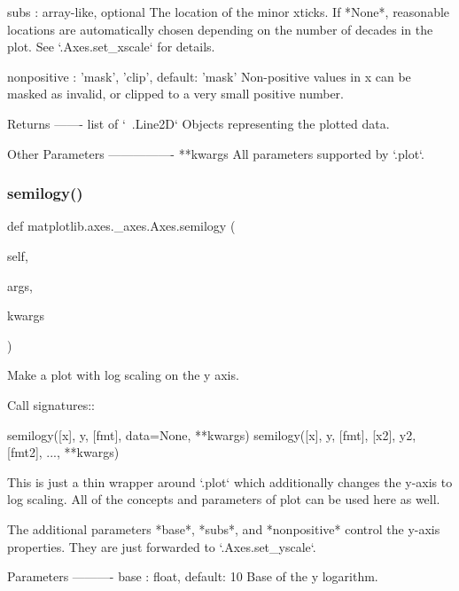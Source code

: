 \begin{DoxyVerb}
\begin{DoxyVerb}
subs : array-like, optional
    The location of the minor xticks. If *None*, reasonable locations
    are automatically chosen depending on the number of decades in the
    plot. See `.Axes.set_xscale` for details.

nonpositive : {'mask', 'clip'}, default: 'mask'
    Non-positive values in x can be masked as invalid, or clipped to a
    very small positive number.

Returns
-------
list of `~.Line2D`
    Objects representing the plotted data.

Other Parameters
----------------
**kwargs
    All parameters supported by `.plot`.
\end{DoxyVerb}
 \mbox{\label{classmatplotlib_1_1axes_1_1__axes_1_1Axes_a0f528c3e2a4da34394c9a3c062656ab4}} 
\subsubsection{\texorpdfstring{semilogy()}{semilogy()}}
{\footnotesize\ttfamily def matplotlib.\+axes.\+\_\+axes.\+Axes.\+semilogy (\begin{DoxyParamCaption}\item[{}]{self,  }\item[{}]{args,  }\item[{}]{kwargs }\end{DoxyParamCaption})}

\begin{DoxyVerb}Make a plot with log scaling on the y axis.

Call signatures::

    semilogy([x], y, [fmt], data=None, **kwargs)
    semilogy([x], y, [fmt], [x2], y2, [fmt2], ..., **kwargs)

This is just a thin wrapper around `.plot` which additionally changes
the y-axis to log scaling. All of the concepts and parameters of plot
can be used here as well.

The additional parameters *base*, *subs*, and *nonpositive* control the
y-axis properties. They are just forwarded to `.Axes.set_yscale`.

Parameters
----------
base : float, default: 10
    Base of the y logarithm.


\end{DoxyVerb}
\end{DoxyVerb}
